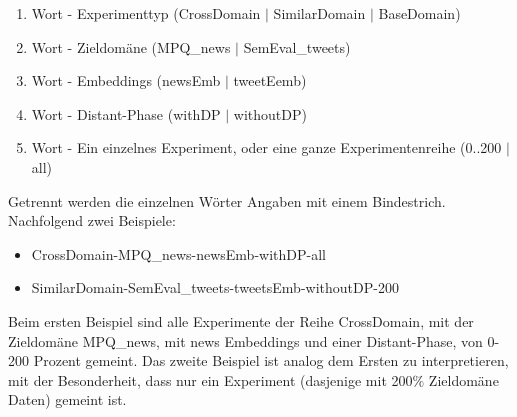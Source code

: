 \begin{enumerate}  
	\item Wort - Experimenttyp (CrossDomain $\vert$ SimilarDomain $\vert$ BaseDomain)
	\item Wort - Zieldomäne (MPQ\_news $\vert$ SemEval\_tweets)
	\item Wort - Embeddings (newsEmb $\vert$ tweetEemb)
	\item Wort - Distant-Phase (withDP $\vert$ withoutDP)
	\item Wort - Ein einzelnes Experiment, oder eine ganze Experimentenreihe (0..200 $\vert$ all)
\end{enumerate}
Getrennt werden die einzelnen Wörter Angaben mit einem Bindestrich. Nachfolgend zwei Beispiele:
\begin{itemize}  
	\item CrossDomain-MPQ\_news-newsEmb-withDP-all
	\item SimilarDomain-SemEval\_tweets-tweetsEmb-withoutDP-200
\end{itemize}
Beim ersten Beispiel sind alle Experimente der Reihe CrossDomain, mit der Zieldomäne MPQ\_news, mit news Embeddings und einer Distant-Phase, von 0-200 Prozent gemeint. Das zweite Beispiel ist analog dem Ersten zu interpretieren, mit der Besonderheit, dass nur ein Experiment (dasjenige mit 200$\%$ Zieldomäne Daten) gemeint ist.

